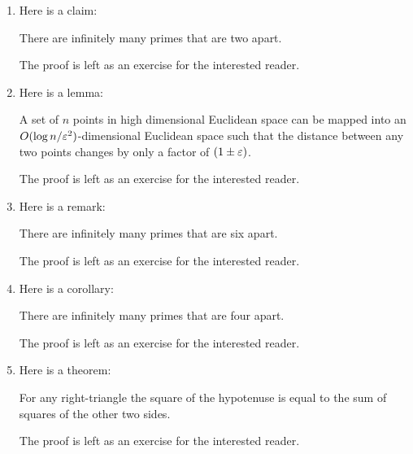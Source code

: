 \documentclass{article}
\begin{document}
\begin{enumerate}
  [
    leftmargin={*},
    label={\arabic*.},
    font={\bf},
    labelsep={10pt},
    itemsep={20pt},
    ref={\arabic*}
  ]
  \item \label{qst:1}
    Here is a claim:
    \begin{claim}\label{clm:1}
      There are infinitely many primes that are two apart.
    \end{claim}
    \begin{proof*}
      The proof is left as an exercise for the interested reader.
    \end{proof*}

  \item \label{qst:2}
    Here is a lemma:
    \begin{lemma}\label{lma:1}
      A set of $n$ points in high dimensional Euclidean space can
      be mapped into an $O(\log n/\varepsilon^2)$-dimensional Euclidean
      space such that the distance between any two points changes
      by only a factor of $(1 \pm \varepsilon)$.
    \end{lemma}
    \begin{proof*}
      The proof is left as an exercise for the interested reader.
    \end{proof*}

  \item \label{qst:3}
    Here is a remark:
    \begin{remark}\label{rem:1}
      There are infinitely many primes that are six apart.
    \end{remark}
    \begin{proof*}
      The proof is left as an exercise for the interested reader.
    \end{proof*}
  
  \item \label{qst:4}
    Here is a corollary:
    \begin{corollary}\label{cor:1}
      There are infinitely many primes that are four apart.
    \end{corollary}
    \begin{proof*}
      The proof is left as an exercise for the interested reader.
    \end{proof*}

  \item \label{qst:5}
    Here is a theorem:
    \begin{theorem}\label{thm:1}
      For any right-triangle the square of the hypotenuse is equal
      to the sum of squares of the other two sides.
    \end{theorem}
    \begin{proof*}
      The proof is left as an exercise for the interested reader.
    \end{proof*}


\end{enumerate}
\end{document}
